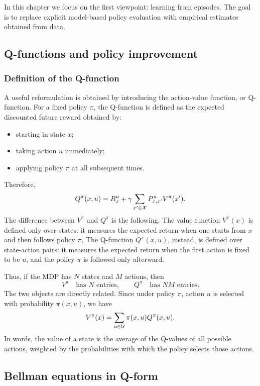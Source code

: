 In this chapter we focus on the first viewpoint: learning from episodes. The goal is to replace
explicit model-based policy evaluation with empirical estimates obtained from data.

\subsection{Q-functions and policy improvement}

\subsubsection{Definition of the Q-function}

A useful reformulation is obtained by introducing the action-value function, or Q-function. For
a fixed policy \(\pi\), the Q-function is defined as the expected discounted future reward obtained
by:
\begin{itemize}
    \item starting in state \(x\);
    \item taking action \(u\) immediately;
    \item applying policy \(\pi\) at all subsequent times.
\end{itemize}
Therefore,
\[
Q^\pi(x,u)
=
R_x^u
+
\gamma\sum_{x'\in\mathcal{X}}P^u_{x,x'}V^\pi(x').
\]
The difference between \(V^\pi\) and \(Q^\pi\) is the following. The value function \(V^\pi(x)\)
is defined only over states: it measures the expected return when one starts from \(x\) and
then follows policy \(\pi\). The Q-function \(Q^\pi(x,u)\), instead, is defined over state-action
pairs: it measures the expected return when the first action is fixed to be \(u\), and the policy
\(\pi\) is followed only afterward.

Thus, if the MDP has \(N\) states and \(M\) actions, then
\[
V^\pi
\quad\text{has }N\text{ entries},
\qquad
Q^\pi
\quad\text{has }NM\text{ entries}.
\]
The two objects are directly related. Since under policy \(\pi\), action \(u\) is selected with
probability \(\pi(x,u)\), we have
\[
V^\pi(x)
=
\sum_{u\in\mathcal{U}}\pi(x,u)Q^\pi(x,u).
\]
In words, the value of a state is the average of the Q-values of all possible actions, weighted
by the probabilities with which the policy selects those actions.

\subsection{Bellman equations in Q-form}

